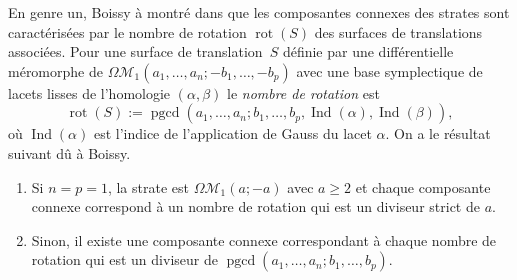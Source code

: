 \documentclass[JEP,XML,SOM,Unicode,francais,NoFloatCountersInSection,published]{cedram}
\let\mathcal\mathscr
\newenvironment{enumeratei}
{\bgroup\def\theenumi{\roman{enumi}}\def\theenumii{\arabic{enumii}}\begin{enumerate}}
{\end{enumerate}\egroup}
\DeclareMathOperator{\pgcd}{pgcd}
\DeclareMathOperator{\rot}{rot}
\DeclareMathOperator{\ind}{Ind}
\newcommand{\omoduli}[1][g]{{\Omega\mathcal M}_{\!#1}}
\theoremstyle{definition}
\begin{document}
En genre un, Boissy à montré dans \cite[\S4.2]{Bo} que les composantes connexes des strates sont caractérisées par le nombre de rotation $\rot(S)$ des surfaces de translations associées. Pour une surface de translation~$S$ définie par une différentielle méromorphe de $\omoduli[1](a_{1},\dots,a_{n};-b_{1},\dots,-b_{p})$ avec une base symplectique de lacets lisses de l'homologie $(\alpha,\beta)$ le \emph{nombre de rotation} est \[
\rot(S):=\pgcd(a_{1},\dots,a_{n};b_{1},\dots,b_{p},\ind(\alpha),\ind(\beta)),\] où $\ind(\alpha)$ est l'indice de l’application de Gauss du lacet $\alpha$. On a le résultat suivant dû à Boissy.
\begin{enumeratei}
\item
Si $n=p=1$, la strate est $\omoduli[1](a;-a)$ avec $a\geq2$ et chaque composante connexe correspond à un nombre de rotation qui est un diviseur strict de $a$.
\item
Sinon, il existe une composante connexe correspondant à chaque nombre de rotation qui est un diviseur de $\pgcd(a_{1},\dots,a_{n};b_{1},\dots,b_{p})$.
\end{enumeratei}
\end{document}

